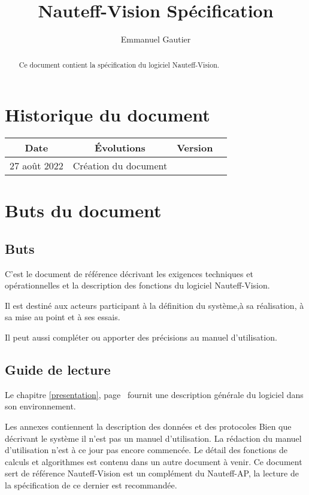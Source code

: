 \documentclass[a4paper,11pt]{report}
\title{Nauteff-Vision Spécification}
\author{Emmanuel Gautier}
\begin{document}
\maketitle

\begin{abstract}
Ce document contient la spécification du logiciel Nauteff-Vision.
\end{abstract}

\chapter*{Historique du document}
\begin{tabular}{|c|c|c|c|}
	\hline 
	Date & Évolutions & Version \\ 
	\hline
	27 août 2022 & Création du document  &  \\ 
	\hline 
\end{tabular} 
\tableofcontents

\chapter{Buts du document}
\section{Buts}

C'est le document de référence décrivant
les exigences techniques et opérationnelles et la description
des fonctions du logiciel Nauteff-Vision.

Il est destiné aux acteurs participant
à la définition du système,à sa réalisation,
à sa mise au point et à ses essais.

Il peut aussi compléter ou apporter des précisions
au manuel d'utilisation.

\section{Guide de lecture}


Le chapitre \ref{presentation}, page\ \pageref{presentation} fournit une description générale du logiciel
dans son environnement.

Les annexes contiennent la description des données et des protocoles 
Bien que décrivant le système il n'est pas un manuel d'utilisation.
La rédaction du manuel d'utilisation n'est à ce jour pas encore commencée.
Le détail des fonctions de calculs et algorithmes est contenu
dans un autre document à venir.
Ce document sert de référence 
Nauteff-Vision est un complément du Nauteff-AP,
la lecture de la spécification de ce dernier est recommandée.
\end{document}
